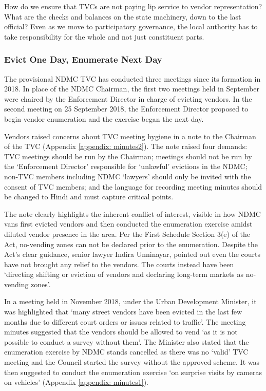 \documentclass[a4paper, 12pt, twoside, table]{article}
\begin{document}
{{How do we ensure that TVCs are not paying lip service to vendor representation? What are the checks and balances on the state machinery, down to the last official? Even as we move to participatory governance, the local authority has to take responsibility for the whole and not just constituent parts.

\subsubsection*{Evict One Day, Enumerate Next Day}

The provisional NDMC TVC has conducted three meetings since its formation in 2018. In place of the NDMC Chairman, the first two meetings held in September were chaired by the Enforcement Director in charge of evicting vendors. In the second meeting on 25 September 2018, the Enforcement Director proposed to begin vendor enumeration and the exercise began the next day.  

Vendors raised concerns about TVC meeting hygiene in a note to the Chairman of the TVC (Appendix \ref{appendix: minutes2}). The note raised four demands: TVC meetings should be run by the Chairman; meetings should not be run by the `Enforcement Director' responsible for `unlawful' evictions in the NDMC; non-TVC members including NDMC ‘lawyers’ should only be invited with the consent of TVC members; and the language for recording meeting minutes should be changed to Hindi and must capture critical points. 

The note clearly highlights the inherent conflict of interest, visible in how NDMC vans first evicted vendors and then conducted the enumeration exercise amidst diluted vendor presence in the area. Per the First Schedule Section 3(e) of the Act, no-vending zones can not be declared prior to the enumeration. Despite the Act's clear guidance, senior lawyer Indira Unninayar, pointed out even the courts have not brought any relief to the vendors. The courts instead have been `directing shifting or eviction of vendors and declaring long-term markets as no-vending zones'.

In a meeting held in November 2018, under the Urban Development Minister, it was highlighted that `many street vendors have been evicted in the last few months due to different court orders or issues related to traffic'. The meeting minutes suggested that the vendors should be allowed to vend `as it is not possible to conduct a survey without them'. The Minister also stated that the enumeration exercise by NDMC stands cancelled as there was no ‘valid’ TVC meeting and the Council started the survey without the approved scheme. It was then suggested to conduct the enumeration exercise `on surprise visits by cameras on vehicles' (Appendix \ref{appendix: minutes1}). 


}}
\end{document}
